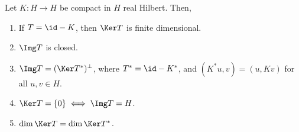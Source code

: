 \documentclass[12pt]{article}
\begin{document}
\begin{theorem}
	Let $K : H \to H$ be compact in $H$ real Hilbert. Then,
	\begin{enumerate}[\normalfont(i)]
		\item If $T = \id - K$, then $\Ker T$ is finite dimensional.
		\item $\Img T$ is closed.
		\item $\Img T = (\Ker T^{\ast})^{\perp}$, where $T^{\ast} = \id - K^{\ast}$, and $(K^{\ast} u, v) = (u, K v)$ for all $u, v \in H$.
		\item $\Ker T = \{0\} \iff \Img T = H$.
		\item $\dim \Ker T = \dim \Ker T^{\ast}$.
	\end{enumerate}
\end{theorem}
\end{document}
